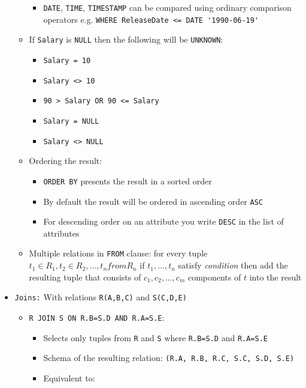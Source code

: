 \documentclass[landscape,8pt]{extarticle}
\newcommand{\code}{\lstinline}
\begin{document}
\begin{multicols}{4}
\begin{itemize}
\begin{itemize}
\begin{itemize}
            \item \code{DATE}, \code{TIME}, \code{TIMESTAMP} can be compared using ordinary
            comparison operators e.g. \code{WHERE ReleaseDate <= DATE '1990-06-19'}
\end{itemize}
        \item If \code{Salary} is \code{NULL} then the following will be \code{UNKNOWN}:
        \begin{itemize}
            \item \code{Salary = 10}
            \item \code{Salary <> 10}
            \item \code{90 > Salary OR 90 <= Salary}
            \item \code{Salary = NULL}
            \item \code{Salary <> NULL}
            \end{itemize}
        \item Ordering the result:
        \begin{itemize}
            \item \code{ORDER BY} presents the result in a sorted order
            \item By default the result will be ordered in ascending order \code{ASC}
            \item For descending order on an attribute you write \code{DESC} in the list of attributes
        \end{itemize}
        \item Multiple relations in \code{FROM} clause: for every tuple $t_1 \in R_1, t_2 \in R_2,
        \ldots, t_n from R_n$ if $t_1, \ldots, t_n$ satisfy \emph{condition} then add the resulting
        tuple that consists of $c_1, c_2, \ldots, c_m$ components of $t$ into the result
    \end{itemize}
    \item \code{Joins:} With relations \code{R(A,B,C)} and \code{S(C,D,E)}
    \begin{itemize}
        \item \code{R JOIN S ON R.B=S.D AND R.A=S.E}:
        \begin{itemize}
            \item Selects only tuples from \code{R} and \code{S} where \code{R.B=S.D} and \code{R.A=S.E}
            \item Schema of the resulting relation: \code{(R.A, R.B, R.C, S.C, S.D, S.E)}
            \item Equivalent to: \\

\end{itemize}
\end{itemize}
\end{itemize}
\end{multicols}
\end{document}
